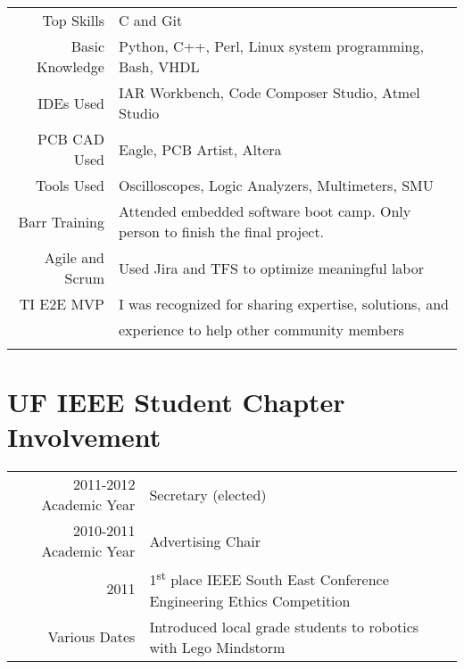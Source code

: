 \documentclass[a4paper,10pt]{article} %
\begin{document}
\begin{tabular}{rl}
Top Skills & C and Git\\
Basic Knowledge & Python, C++, Perl, Linux system programming, Bash, VHDL\\
IDEs Used & IAR Workbench, Code Composer Studio, Atmel Studio\\
PCB CAD Used & Eagle, PCB Artist, Altera\\
Tools Used &  Oscilloscopes, Logic Analyzers, Multimeters, SMU\\
Barr Training &  Attended embedded software boot camp. Only person to finish the final project.\\
Agile and Scrum & Used Jira and TFS to optimize meaningful labor\\
TI E2E MVP & I was recognized for sharing expertise, solutions, and \\ &  \hspace{5mm} experience to help other community members\\
\\
\end{tabular}

\section{UF IEEE Student Chapter Involvement}

\begin{tabular}{rl}
2011-2012 Academic Year &  Secretary (elected) \\

2010-2011 Academic Year & Advertising Chair \\

2011 & 1\textsuperscript{st} place IEEE South East Conference Engineering Ethics Competition\\

Various Dates & Introduced local grade students to robotics with Lego Mindstorm\\
\end{tabular}


\end{document}

